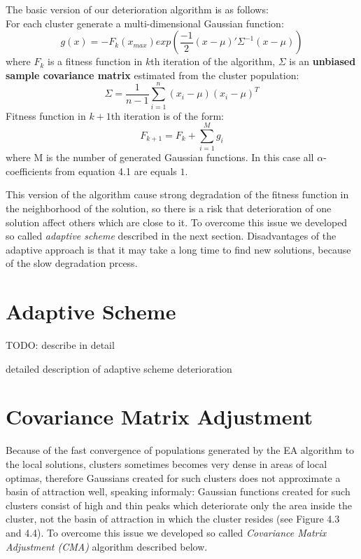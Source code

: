 The basic version of our deterioration algorithm is as follows: \\
For each cluster generate a multi-dimensional Gaussian function:
\begin{equation}
 g(x)= - F_k(x_{max}) exp(\frac{-1}{2}(x-\mu)'\Sigma^{-1}(x - \mu))
\end{equation}
where $F_k$ is a fitness function in $k$th iteration of the algorithm,
$\Sigma$ is an \textbf{unbiased sample covariance matrix} \cite{covariance}
estimated from the cluster population:
\begin{equation}
 \Sigma = \frac{1}{n-1}\sum_{i=1}^n(x_i - \mu)(x_i - \mu)^T
\end{equation}
Fitness function in $k+1$th iteration is of the form:
\begin{equation}
 F_{k+1}=F_k + \sum_{i=1}^M g_i
\end{equation}
where M is the number of generated Gaussian functions. In this case all
$\alpha$-coefficients from equation 4.1 are equals $1$.

This version of the algorithm cause strong degradation of the fitness function
in the neighborhood of the solution, so there is a risk that deterioration of
one solution affect others which are close to it. To overcome this issue we
developed so called \textit{adaptive scheme} described in the next section.
Disadvantages of the adaptive approach is that it may take a long time
to find new solutions, because of the slow degradation prcess. 

\section{Adaptive Scheme}
TODO: describe in detail

detailed description of adaptive scheme deterioration

\section{Covariance Matrix Adjustment}
Because of the fast convergence of populations
generated by the EA algorithm to the local solutions, clusters sometimes becomes
very dense in areas of local optimas, therefore Gaussians created for such
clusters does not approximate a basin of attraction well, speaking informaly:
Gaussian functions created for such clusters consist of high and thin peaks
which deteriorate only the area inside the cluster, not the basin of attraction
in which the cluster resides (see Figure 4.3 and 4.4).
To overcome this issue we developed so called \textit{Covariance Matrix
Adjustment (CMA)} algorithm described below.


